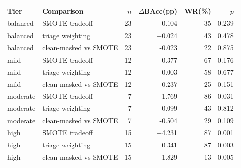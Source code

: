 \begin{tabular}{llrrrr}\toprule
Tier & Comparison & $n$ & $\Delta$BAcc(pp) & WR(\%) & $p$ \\\midrule
balanced & SMOTE tradeoff & 23 & +0.104 & 35 & 0.239 \\
balanced & triage weighting & 23 & +0.024 & 43 & 0.478 \\
balanced & clean-masked vs SMOTE & 23 & -0.023 & 22 & 0.875 \\
\midrule
mild & SMOTE tradeoff & 12 & +0.377 & 67 & 0.176 \\
mild & triage weighting & 12 & +0.003 & 58 & 0.677 \\
mild & clean-masked vs SMOTE & 12 & -0.237 & 25 & 0.151 \\
\midrule
moderate & SMOTE tradeoff & 7 & +1.769 & 86 & 0.031 \\
moderate & triage weighting & 7 & -0.099 & 43 & 0.812 \\
moderate & clean-masked vs SMOTE & 7 & -0.504 & 29 & 0.109 \\
\midrule
high & SMOTE tradeoff & 15 & +4.231 & 87 & 0.001 \\
high & triage weighting & 15 & +0.341 & 87 & 0.003 \\
high & clean-masked vs SMOTE & 15 & -1.829 & 13 & 0.005 \\
\bottomrule
\end{tabular}